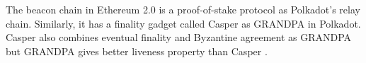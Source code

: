 The beacon chain in Ethereum 2.0 is a proof-of-stake protocol as Polkadot's relay chain. Similarly, it has a finality gadget called Casper \cite{CasperFFG,CasperCBC} as GRANDPA in Polkadot. Casper also combines  eventual finality and  Byzantine agreement as GRANDPA but GRANDPA gives better liveness property than Casper \cite{2018:Stewart:Grandpa}.
